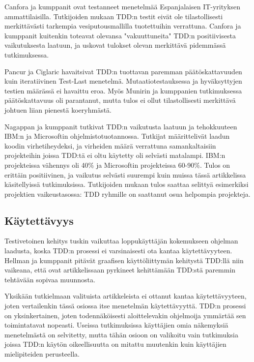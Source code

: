 \documentclass[finnish]{tktltiki2}
\theoremstyle{definition}
\theoremstyle{remark}
\begin{document}
 Canfora ja kumppanit \cite{Canfora06} ovat testanneet menetelmää Espanjalaisen IT-yrityksen ammattilaisilla. Tutkijoiden mukaan TDD:n testit eivät ole tilastollisesti merkittävästi tarkempia vesiputousmallilla tuotettuihin verrattuna. Canfora ja kumppanit kuitenkin toteavat olevansa "vakuuttuneita" TDD:n positiivisesta vaikutuksesta laatuun, ja uskovat tulokset olevan merkittävä pidemmässä tutkimuksessa.

Pancur ja Ciglaric \cite{Pancur11} havaitsivat TDD:n tuottavan paremman päätöskattavuuden kuin iteratiivinen Test-Last menetelmä. Mutaatiotestauksessa ja hyväksyttyjen testien määrässä ei havaittu eroa. Myös Munirin ja kumppanien \cite{Munir14} tutkimuksessa päätöskattavuus oli parantanut, mutta tulos ei ollut tilastollisesti merkittävä johtuen liian pienestä koeryhmästä.

Nagappan ja kumppanit \cite{Nagappan08} tutkivat TDD:n vaikutusta laatuun ja tehokkuuteen IBM:n ja Microsoftin ohjelmistotuotannossa. Tutkijat määrittelivät laadun koodin virhetiheydeksi, ja virheiden määrä verrattuna samankaltaisiin projekteihin joissa TDD:tä ei oltu käytetty oli selvästi matalampi. IBM:n projekteissa vähennys oli 40\% ja Microsoftin projekteissa 60-90\%. Tulos on erittäin positiivinen, ja vaikutus selvästi suurempi kuin muissa tässä artikkelissa käsitellyissä tutkimuksissa. Tutkijoiden mukaan tulos saattaa selittyä esimerkiksi projektien vaikeustasossa: TDD ryhmille on saattanut osua helpompia projekteja.

\subsection{Käytettävyys}

Testivetoinen kehitys tuskin vaikuttaa loppukäyttäjän kokemukseen ohjelman laadusta, koska TDD:n prosessi ei varsinaisesti ota kantaa käytettävyyteen. Hellman ja kumppanit \cite{Hellman10} pitävät graafisen käyttöliittymän kehitystä TDD:llä niin vaikeana, että ovat artikkelissaan pyrkineet kehittämään TDD:stä paremmin tehtävään sopivaa muunnosta.

Yksikään tutkielmaan valituista artikkeleista ei ottanut kantaa käytettävyyteen, joten vertailenkin tässä osiossa itse menetelmän käytettävyyttä. TDD:n prosessi on yksinkertainen, joten todennäköisesti aloittelevakin ohjelmoija ymmärtää sen toimintatavat nopeasti. Useissa tutkimuksissa käyttäjien omia näkemyksiä menetelmästä on selvitetty, mutta tähän osioon on valikoitu vain tutkimuksia joissa TDD:n käytön oikeellisuutta on mitattu muutenkin kuin käyttäjien mielipiteiden perusteella.
\end{document}
